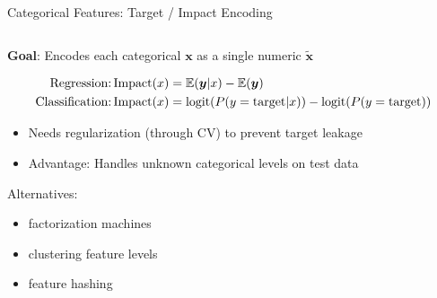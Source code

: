\begin{frame}{Categorical Features: Target / Impact Encoding}
\begin{columns}
\begin{column}{0.7\textwidth}
				
				\textbf{Goal}: Encodes each categorical $\bm{x}$ as a single numeric $\tilde{\bm{x}}$
				
				\vspace*{-0.5cm}  
				{\footnotesize
					\begin{align*}
						\text{Regression:} \operatorname{Impact}(x) &= \operatorname*{\mathbb{E}}(\bm{y} | x) - \operatorname*{\mathbb{E}}(\bm{y}) \\
						\text{Classification:} \operatorname{Impact}(x) &= \operatorname{logit}(P( y = \text{target} | x)) - \operatorname{logit}(P( y = \text{target}))
					\end{align*}
				}
				\vspace*{-0.5cm}  
				\begin{itemize}
					
					\item Needs regularization (through CV) to prevent target leakage 
					
					\item Advantage: Handles unknown categorical levels on test data
				\end{itemize}
				\pause
				Alternatives: 
				\begin{itemize}
					\item factorization machines 
					\item clustering feature levels 
					\item feature hashing
				\end{itemize}
			\end{column}%

		\end{columns}
	\end{frame}
	
